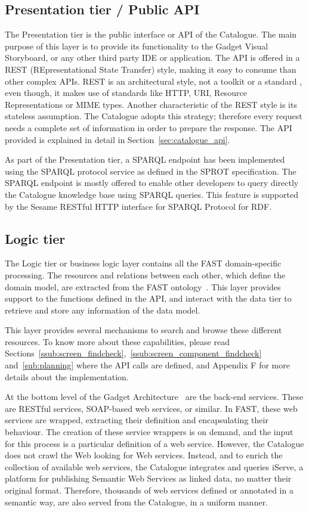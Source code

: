 \documentclass{fast_latex}
\begin{document}
\subsection{Presentation tier / Public API}

The Presentation tier is the public interface or API of the Catalogue. The main purpose of this layer is to provide its functionality to the Gadget Visual Storyboard, or any other third party IDE or application. The API is offered in a REST (REpresentational State Transfer) style, making it easy to consume than other complex APIs. REST is an architectural style, not a toolkit or a standard , even though, it makes use of standards like HTTP, URI, Resource Representations or MIME types. Another characteristic of the REST style is its stateless assumption. The Catalogue adopts this strategy; therefore every request needs a complete set of information in order to prepare the response. The API provided is explained in detail in Section~\ref{sec:catalogue_api}.

As part of the Presentation tier, a SPARQL endpoint has been implemented using the SPARQL protocol service as defined in the SPROT \cite{sprot} specification. The SPARQL endpoint is mostly offered to enable other developers to query directly the Catalogue knowledge base using SPARQL queries. This feature is supported by the Sesame RESTful HTTP interface for SPARQL Protocol for RDF.

\subsection{Logic tier}
\label{ssec:logic_tier}

The Logic tier or business logic layer contains all the FAST domain-specific processing. The resources and relations between each other, which define the domain model, are extracted from the FAST ontology~\cite{moeller2011fast_ontology}. This layer provides support to the functions defined in the API, and interact with the data tier to retrieve and store any information of the data model.

This layer provides several mechanisms to search and browse these different resources. To know more about these capabilities, please read Sections~\ref{ssub:screen_findcheck},~\ref{ssub:screen_component_findcheck} and~\ref{sub:planning} where the API calls are defined, and Appendix F for more details about the implementation.

At the bottom level of the Gadget Architecture~\cite{reyes2011gadget_architecture} are the back-end services. These are RESTful services, SOAP-based web services, or similar. In FAST, these web services are wrapped, extracting their definition and encapsulating their behaviour. The creation of these service wrappers is on demand, and the input for this process is a particular definition of a web service. However, the Catalogue does not crawl the Web looking for Web services. Instead, and to enrich the collection of available web services, the Catalogue integrates and queries iServe, a platform for publishing Semantic Web Services as linked data, no matter their original format. Therefore, thousands of web services defined or annotated in a semantic way, are also served from the Catalogue, in a uniform manner.
\end{document}
